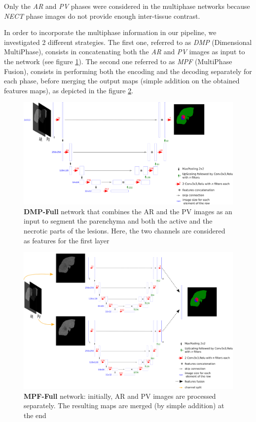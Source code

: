 \documentclass[]{article}
\newcommand{\pplfont}[1]{{\textbf{\fontfamily{ppl}\selectfont #1}}}
\begin{document}
	Only the \emph{AR} and \emph{PV} phases were considered in the
	multiphase networks because \emph{NECT} phase images do not provide enough
	inter-tissue contrast.
	
	In order to incorporate the multiphase information in our pipeline, we
	investigated 2 different strategies. The first one, referred to as
	\emph{DMP} (Dimensional MultiPhase), consists in concatenating both the
	\emph{AR} and \emph{PV} images as input to the network (see figure \ref{CARS_DMP_Full_Fig}).
	The second one referred to as \emph{MPF} (MultiPhase Fusion), consists
	in performing both the encoding and the decoding separately for each
	phase, before merging the output maps (simple addition on the obtained
	features maps), as depicted in the figure \ref{CARS_MPF_Full_Fig}.
	
	\begin{figure}[th!]
		\centering
		\includegraphics[width=0.7\linewidth]{images/image28}
		\caption{\pplfont{DMP-Full} network that combines the AR and the PV images as an input to segment the parenchyma and both the active and the necrotic parts of the lesions. Here, the two channels are considered as features for the first layer}
		\label{CARS_DMP_Full_Fig}
	\end{figure}
	
	
	\begin{figure}[th!]
		\centering
		\includegraphics[width=0.7\linewidth]{images/image36}
		\caption{\pplfont{MPF-Full} network: initially, AR and PV images are processed separately. The resulting maps are merged (by simple addition) at the end}
		\label{CARS_MPF_Full_Fig}
	\end{figure}
	
\end{document}
